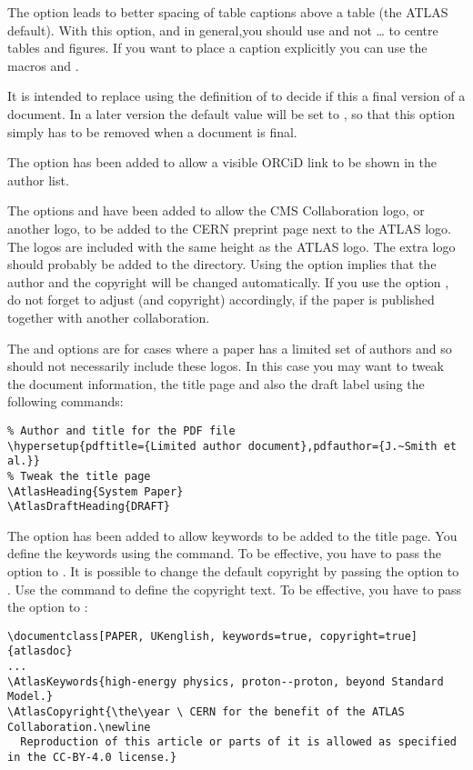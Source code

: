  The option  leads to better spacing of table captions above a table (the ATLAS default).
With this option, and in general,you should use 
and not \ldots{} to centre tables and figures.
If you want to place a caption explicitly you can use
the macros  and .

 It is intended to replace using the definition of  to decide if this a final version of a document.
In a later version the default value will be set to ,
so that this option simply has to be removed when a document is final.

 The option  has been added to allow
a visible ORCiD link to be shown in the author list.

 The options  and  have been added to allow
the CMS Collaboration logo, or another logo, to be added to the CERN preprint page next to the ATLAS logo.
The logos are included with the same height as the ATLAS logo.
The extra logo should probably be added to the  directory.
Using the option  implies that the author and the copyright will be changed automatically.
If you use the option , do not forget to adjust  (and copyright) accordingly,
if the paper is published together with another collaboration.

The  and  options are for cases where a paper has a limited set of authors
and so should not necessarily include these logos.
In this case you may want to tweak the  document information,
the title page and also the draft label using the following commands:
\begin{verbatim}
% Author and title for the PDF file
\hypersetup{pdftitle={Limited author document},pdfauthor={J.~Smith et al.}}
% Tweak the title page
\AtlasHeading{System Paper}
\AtlasDraftHeading{DRAFT}
\end{verbatim}

 The option  has been added to allow keywords to be added to the title page.
You define the keywords using the  command.
To be effective, you have to pass the  option to .
It is possible to change the default copyright by passing the  option to .
Use the  command to define the copyright text.
To be effective, you have to pass the  option to :
\begin{verbatim}
\documentclass[PAPER, UKenglish, keywords=true, copyright=true]{atlasdoc}
...
\AtlasKeywords{high-energy physics, proton--proton, beyond Standard Model.}
\AtlasCopyright{\the\year \ CERN for the benefit of the ATLAS Collaboration.\newline
  Reproduction of this article or parts of it is allowed as specified in the CC-BY-4.0 license.}
\end{verbatim}

